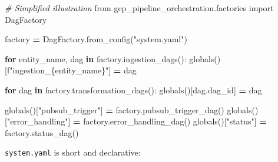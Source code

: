 \documentclass[
  11pt,
  british,
  oneside]{book}
\newenvironment{Shaded}{\begin{snugshade}}{\end{snugshade}}
\newcommand{\BuiltInTok}[1]{#1}
\newcommand{\CommentTok}[1]{\textcolor[rgb]{0.56,0.35,0.01}{\textit{#1}}}
\newcommand{\ControlFlowTok}[1]{\textcolor[rgb]{0.13,0.29,0.53}{\textbf{#1}}}
\newcommand{\ImportTok}[1]{#1}
\newcommand{\KeywordTok}[1]{\textcolor[rgb]{0.13,0.29,0.53}{\textbf{#1}}}
\newcommand{\NormalTok}[1]{#1}
\newcommand{\OperatorTok}[1]{\textcolor[rgb]{0.81,0.36,0.00}{\textbf{#1}}}
\newcommand{\SpecialCharTok}[1]{\textcolor[rgb]{0.00,0.00,0.00}{#1}}
\newcommand{\SpecialStringTok}[1]{\textcolor[rgb]{0.31,0.60,0.02}{#1}}
\newcommand{\StringTok}[1]{\textcolor[rgb]{0.31,0.60,0.02}{#1}}
\begin{document}
\begin{Shaded}
\begin{Highlighting}[]
\CommentTok{\# Simplified illustration}
\ImportTok{from}\NormalTok{ gcp\_pipeline\_orchestration.factories }\ImportTok{import}\NormalTok{ DagFactory}

\NormalTok{factory }\OperatorTok{=}\NormalTok{ DagFactory.from\_config(}\StringTok{"system.yaml"}\NormalTok{)}

\ControlFlowTok{for}\NormalTok{ entity\_name, dag }\KeywordTok{in}\NormalTok{ factory.ingestion\_dags():}
    \BuiltInTok{globals}\NormalTok{()[}\SpecialStringTok{f"ingestion\_}\SpecialCharTok{\{}\NormalTok{entity\_name}\SpecialCharTok{\}}\SpecialStringTok{"}\NormalTok{] }\OperatorTok{=}\NormalTok{ dag}

\ControlFlowTok{for}\NormalTok{ dag }\KeywordTok{in}\NormalTok{ factory.transformation\_dags():}
    \BuiltInTok{globals}\NormalTok{()[dag.dag\_id] }\OperatorTok{=}\NormalTok{ dag}

\BuiltInTok{globals}\NormalTok{()[}\StringTok{"pubsub\_trigger"}\NormalTok{] }\OperatorTok{=}\NormalTok{ factory.pubsub\_trigger\_dag()}
\BuiltInTok{globals}\NormalTok{()[}\StringTok{"error\_handling"}\NormalTok{] }\OperatorTok{=}\NormalTok{ factory.error\_handling\_dag()}
\BuiltInTok{globals}\NormalTok{()[}\StringTok{"status"}\NormalTok{] }\OperatorTok{=}\NormalTok{ factory.status\_dag()}
\end{Highlighting}
\end{Shaded}

\texttt{system.yaml} is short and declarative:
\end{document}
